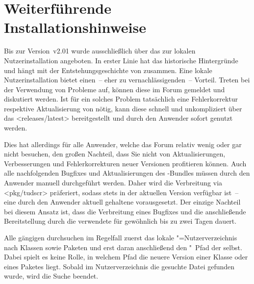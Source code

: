 \chapter{%
  Weiterführende Installationshinweise%
  \label{sec:install:ext}%
}

\bigskip\noindent
Bis zur Version~v2.01 wurde \TUDScript ausschließlich über das \Forum zur 
lokalen Nutzerinstallation angeboten. In erster Linie hat das historische 
Hintergründe und hängt mit der Entstehungsgeschichte von \TUDScript zusammen. 
Eine lokale Nutzerinstallation bietet einen~-- eher zu vernachlässigenden~-- 
Vorteil. Treten bei der Verwendung von \TUDScript Probleme auf, können diese im 
Forum gemeldet und diskutiert werden. Ist für ein solches Problem tatsächlich 
eine Fehlerkorrektur respektive Aktualisierung von \TUDScript nötig, kann diese 
schnell und unkompliziert über das \GitHubRepo<releases/latest> bereitgestellt 
und durch den Anwender sofort genutzt werden.

Dies hat allerdings für alle Anwender, welche das Forum relativ wenig oder gar 
nicht besuchen, den großen Nachteil, dass Sie nicht von Aktualisierungen, 
Verbesserungen und Fehlerkorrekturen neuer Versionen profitieren können. Auch 
alle nachfolgenden Bugfixes und Aktualisierungen des \TUDScript-Bundles müssen 
durch den Anwender manuell durchgeführt werden. Daher wird die Verbreitung via 
\CTAN<pkg/tudscr> präferiert, sodass \TUDScript stets in der aktuellen Version 
verfügbar ist~-- eine durch den Anwender aktuell gehaltene \DistributionGeneral 
vorausgesetzt. Der einzige Nachteil bei diesem Ansatz ist, dass die Verbreitung 
eines Bugfixes und die anschließende Bereitstellung durch die verwendete 
\DistributionGeneral für gewöhnlich bis zu zwei Tagen dauert.

Alle gängigen \DistributionGeneral* durchsuchen im Regelfall zuerst das lokale 
"=Nutzerverzeichnis nach Klassen sowie Paketen und erst daran 
anschließend den "~Pfad der \DistributionGeneral selbst. Dabei 
spielt es keine Rolle, in welchem Pfad die neuere Version einer Klasse oder 
eines Paketes liegt. Sobald im Nutzerverzeichnis die gesuchte Datei gefunden 
wurde, wird die Suche beendet.

